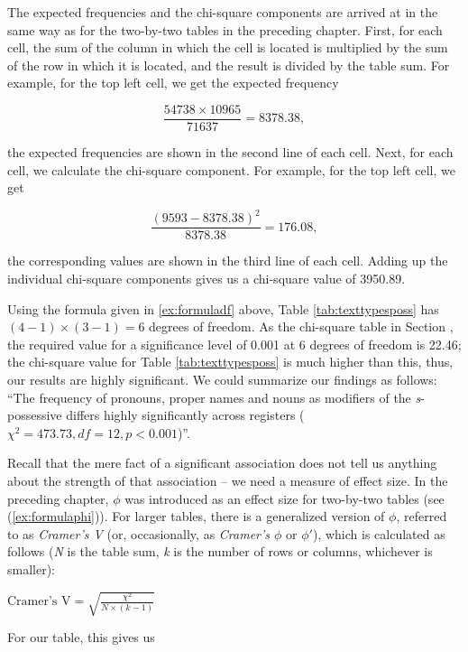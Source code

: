 The expected frequencies and the chi-square components are arrived at in the same way as for the two-by-two tables in the preceding chapter. First, for each cell, the sum of the column in which the cell is located is multiplied by the sum of the row in which it is located, and the result is divided by the table sum. For example, for the top left cell, we get the expected frequency

$$\frac{54738 \times 10965}{71637} = 8378.38,$$

the expected frequencies are shown in the second line of each cell. Next, for each cell, we calculate the chi-square component. For example, for the top left cell, we get

$$\frac{(9593 - 8378.38)^2}{8378.38} = 176.08,$$

the corresponding values are shown in the third line of each cell. Adding up the individual chi-square components gives us a chi-square value of 3950.89.

Using the formula given in \ref{ex:formuladf} above, Table \ref{tab:texttypesposs} has $(4 -1) \times (3 - 1) = 6$ degrees of freedom. As the chi-square table in Section \label{sec:chisquarecriticalvalues}, the required value for a significance level of 0.001 at 6 degrees of freedom is 22.46; the chi-square value for Table \ref{tab:texttypesposs} is much higher than this, thus, our results are highly significant. We could summarize our findings as follows: ``The frequency of pronouns, proper names and nouns as modifiers of the \textit{s}-possessive differs highly significantly across registers ($\chi^2 = 473.73, df = 12, p < 0.001$)''.

Recall that the mere fact of a significant association does not tell us anything about the strength of that association -- we need a measure of effect size. In the preceding chapter, $\phi$ was introduced as an effect size for two-by-two tables (see (\ref{ex:formulaphi})). For larger tables, there is a generalized version of $\phi$, referred to as \textit{Cramer's V} (or, occasionally, as \textit{Cramer's $\phi$} or $\phi'$), which is calculated as follows (\textit{N} is the table sum, \textit{k} is the number of rows or columns, whichever is smaller):

\begin{exe}
\ex $\displaystyle{\text{Cramer's V} = \sqrt{\frac{\chi^2}{N \times (k - 1)}}}$ 
\label{ex:cramersv}
\end{exe}

For our table, this gives us

